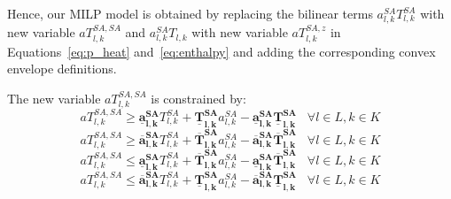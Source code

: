 Hence, our MILP model is obtained by replacing the bilinear terms $a_{l,k}^{SA}T_{l,k}^{SA}$ with new variable $aT_{l,k}^{SA,SA}$ and $a_{l,k}^{SA}T_{l,k}$ with new variable $aT_{l,k}^{SA,z}$ in Equations~\eqref{eq:p_heat} and~\eqref{eq:enthalpy} and adding the corresponding convex envelope definitions. 

The new variable $aT_{l,k}^{SA,SA}$ is constrained by:
\begin{equation}
aT_{l,k}^{SA,SA} \geq \bm{\underline{a}^{SA}_{l,k}} T_{l,k}^{SA} + \bm{\underline{T}^{SA}_{l,k}} a_{l,k}^{SA} - \bm{\underline{a}^{SA}_{l,k}} \bm{\underline{T}^{SA}_{l,k}}\hspace{10pt} \forall l \in L, k \in K 
\end{equation}
\begin{equation}
aT_{l,k}^{SA,SA} \geq \bm{\overline{a}^{SA}_{l,k}} T_{l,k}^{SA} + \bm{\overline{T}^{SA}_{l,k}} a_{l,k}^{SA} - \bm{\overline{a}^{SA}_{l,k}} \bm{\overline{T}^{SA}_{l,k}}\hspace{10pt} \forall l \in L, k \in K 
\end{equation}
\begin{equation}
aT_{l,k}^{SA,SA} \leq  \bm{\underline{a}^{SA}_{l,k}} T_{l,k}^{SA} + \bm{\overline{T}^{SA}_{l,k}} a_{l,k}^{SA} - \bm{\underline{a}^{SA}_{l,k}} \bm{\overline{T}^{SA}_{l,k}}\hspace{10pt} \forall l \in L, k \in K 
\end{equation}
\begin{equation}
aT_{l,k}^{SA,SA} \leq  \bm{\overline{a}^{SA}_{l,k}} T_{l,k}^{SA} + \bm{\underline{T}^{SA}_{l,k}} a_{l,k}^{SA} - \bm{\overline{a}^{SA}_{l,k}} \bm{\underline{T}^{SA}_{l,k}}\hspace{10pt} \forall l \in L, k \in K 
\end{equation}

